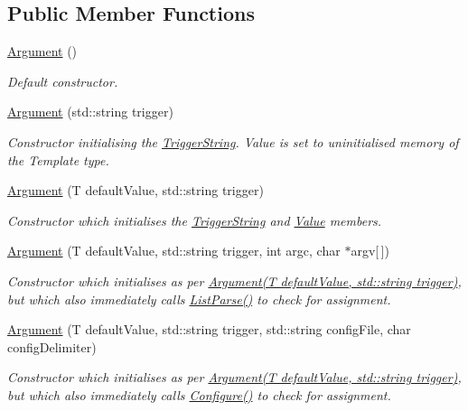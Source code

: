 \subsection*{Public Member Functions}
\begin{DoxyCompactItemize}
\item 
\hyperlink{classJSL_1_1Argument_ab438509a3c030516de72f3f493295bd5}{Argument} ()
\begin{DoxyCompactList}\small\item\em Default constructor. \end{DoxyCompactList}\item 
\hyperlink{classJSL_1_1Argument_ab07e7981db832cce30f534c67f6491f4}{Argument} (std\+::string trigger)
\begin{DoxyCompactList}\small\item\em Constructor initialising the \hyperlink{classJSL_1_1ArgumentInterface_afa2d1f96c4971070d3de5824f297312f}{Trigger\+String}. Value is set to uninitialised memory of the Template type. \end{DoxyCompactList}\item 
\hyperlink{classJSL_1_1Argument_a2511f7c98ee2b0b59650f468341b8747}{Argument} (T default\+Value, std\+::string trigger)
\begin{DoxyCompactList}\small\item\em Constructor which initialises the \hyperlink{classJSL_1_1ArgumentInterface_afa2d1f96c4971070d3de5824f297312f}{Trigger\+String} and \hyperlink{classJSL_1_1Argument_a83ada5bfa412192f76dd4290f679defd}{Value} members. \end{DoxyCompactList}\item 
\hyperlink{classJSL_1_1Argument_a4d187d2fb658021866b173987b920ab4}{Argument} (T default\+Value, std\+::string trigger, int argc, char $\ast$argv\mbox{[}$\,$\mbox{]})
\begin{DoxyCompactList}\small\item\em Constructor which initialises as per \hyperlink{classJSL_1_1Argument_a2511f7c98ee2b0b59650f468341b8747}{Argument(\+T default\+Value, std\+::string trigger)}, but which also immediately calls \hyperlink{classJSL_1_1Argument_aa2b18bb35e90f91e224a06d60835053a}{List\+Parse()} to check for assignment. \end{DoxyCompactList}\item 
\hyperlink{classJSL_1_1Argument_a83799e9089f88d7e6cf30990fae42610}{Argument} (T default\+Value, std\+::string trigger, std\+::string config\+File, char config\+Delimiter)
\begin{DoxyCompactList}\small\item\em Constructor which initialises as per \hyperlink{classJSL_1_1Argument_a2511f7c98ee2b0b59650f468341b8747}{Argument(\+T default\+Value, std\+::string trigger)}, but which also immediately calls \hyperlink{classJSL_1_1Argument_aa626ff37dbebaf0501614dc625a76383}{Configure()} to check for assignment. \end{DoxyCompactList}\item 

\end{DoxyCompactItemize}
